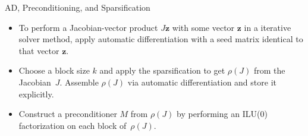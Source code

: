 \documentclass{beamer}
\newcommand{\vek}[1]{{\ensuremath{\mathbf #1}}}
\newcommand{\sparsifysymbol}{\ensuremath{\rho}}
\newcommand{\sparsify}[1]{\ensuremath{\sparsifysymbol(#1)}}
\begin{document}
\begin{frame}{AD, Preconditioning, and Sparsification}
\begin{itemize}
  \item To perform a Jacobian-vector product $J \vek{z}$ with some vector \vek{z} in a
      iterative solver method, apply automatic differentiation with a seed matrix
      identical to that vector \vek{z}. 
  \item Choose a block size $k$ and apply the sparsification to get \sparsify{J} from
      the Jacobian~$J$. Assemble \sparsify{J} via automatic differentiation and store
      it explicitly.
  \item Construct a preconditioner $M$ from \sparsify{J} by performing an ILU(0)
      factorization on each block of~\sparsify{J}. 
\end{itemize}
\end{frame}
\end{document}
